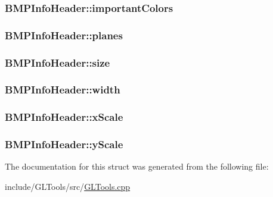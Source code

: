 \hypertarget{struct_b_m_p_info_header_a35e2f798242ca4e2c68fa4bef9d14cbc}{
\subsubsection[{important\-Colors}]{ B\-M\-P\-Info\-Header\-::important\-Colors}}\label{struct_b_m_p_info_header_a35e2f798242ca4e2c68fa4bef9d14cbc}
\hypertarget{struct_b_m_p_info_header_a1697f773d6987a7ee3c387e3d406e116}{
\subsubsection[{planes}]{ B\-M\-P\-Info\-Header\-::planes}}\label{struct_b_m_p_info_header_a1697f773d6987a7ee3c387e3d406e116}
\hypertarget{struct_b_m_p_info_header_ad00b1bd31f6235d5a083179a74267cbe}{
\subsubsection[{size}]{ B\-M\-P\-Info\-Header\-::size}}\label{struct_b_m_p_info_header_ad00b1bd31f6235d5a083179a74267cbe}
\hypertarget{struct_b_m_p_info_header_af32290c3171c40da6914892acf83112d}{
\subsubsection[{width}]{ B\-M\-P\-Info\-Header\-::width}}\label{struct_b_m_p_info_header_af32290c3171c40da6914892acf83112d}
\hypertarget{struct_b_m_p_info_header_a6635a48d388d6b71486f7be87bdcb425}{
\subsubsection[{x\-Scale}]{ B\-M\-P\-Info\-Header\-::x\-Scale}}\label{struct_b_m_p_info_header_a6635a48d388d6b71486f7be87bdcb425}
\hypertarget{struct_b_m_p_info_header_a210749e24d5ce5eb1936b5e8882123dd}{
\subsubsection[{y\-Scale}]{ B\-M\-P\-Info\-Header\-::y\-Scale}}\label{struct_b_m_p_info_header_a210749e24d5ce5eb1936b5e8882123dd}


The documentation for this struct was generated from the following file\-:\begin{DoxyCompactItemize}
\item 
include/\-G\-L\-Tools/src/\hyperlink{_g_l_tools_8cpp}{G\-L\-Tools.\-cpp}\end{DoxyCompactItemize}
